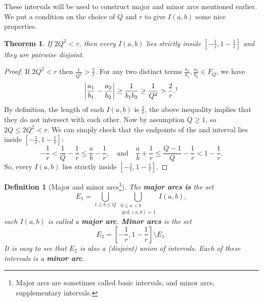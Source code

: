 \documentclass{article}
\newtheorem{theorem}{Theorem}
\newtheorem{definition}{Definition}
\begin{document}
These intervals will be used to construct major and minor arcs mentioned earlier. We put a condition on the choice of $Q$ and $r$ to give $I(a,b)$ some nice properties.
\begin{theorem}\label{2q}
    If $2Q^2 < r$, then every $I(a,b)$ lies strictly inside $\displaystyle \left[-\frac{1}{r}, 1 -\frac{1}{r}\right]$ and they are pairwise disjoint.
\end{theorem}
\begin{proof}
    If $2Q^2 < r$ then $\displaystyle \frac{1}{Q^2} > \frac{2}{r}$. For any two distinct terms $\displaystyle \frac{a_1}{b_1}, \frac{a_2}{b_2} \in F_Q$, we have
    \begin{equation*}
        \left |\frac{a_1}{b_1} -\frac{a_2}{b_2} \right| \geq \frac{1}{b_1b_2} \geq \frac{1}{Q^2} > \frac{2}{r}.\footnotemark{}
    \end{equation*}
    By definition, the length of each $I(a,b)$ is $\frac{2}{r}$, the above inequality implies that they do not intersect with each other. Now by assumption $Q \geq 1$, so $2Q \leq 2Q^2 < r$. We can simply check that the endpoints of the  and  interval lies inside $\left[-\frac{1}{r}, 1 -\frac{1}{r}\right]$:
    \begin{equation*}
        -\frac{1}{r} < \frac{1}{Q} - \frac{1}{r} \leq \frac{a}{b} - \frac{1}{r}, \quad \text{and} \quad \frac{a}{b} + \frac{1}{r} \leq \frac{Q-1}{Q} - \frac{1}{r} < 1 - \frac{1}{r}.
    \end{equation*}
    So, every $I(a,b)$ lies strictly inside $\displaystyle \left[-\frac{1}{r}, 1 -\frac{1}{r}\right]$. 
\end{proof} 
\begin{definition}[Major and minor arcs\footnote{Major arcs are sometimes called basic intervals, and minor arcs, supplementary intervals.}]
The \textbf{major arcs is} the set 
\begin{equation*}
    E_1 = \bigcup_{1 \leq b \leq Q}\bigcup_{\substack{0 \leq a < b\\ \gcd(a,b) = 1}} I(a,b),
\end{equation*}
each $I(a,b)$ is called a \textbf{major arc}. \textbf{Minor arcs} is the set
\begin{equation*}
    E_2 = \left[-\frac{1}{r}, 1 -\frac{1}{r}\right] \setminus E_1.
\end{equation*}
It is easy to see that $E_2$ is also a (disjoint) union of intervals. Each of these intervals is a \textbf{minor arc}.
\end{definition}
\end{document}
